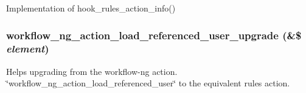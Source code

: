 Implementation of hook\_\-rules\_\-action\_\-info() \hypertarget{userreference_8rules_8inc_83d45657e432a674912574d8efc65684}{
\subsubsection[{workflow\_\-ng\_\-action\_\-load\_\-referenced\_\-user\_\-upgrade}]{\setlength{\rightskip}{0pt plus 5cm}workflow\_\-ng\_\-action\_\-load\_\-referenced\_\-user\_\-upgrade (\&\$ {\em element})}}
\label{userreference_8rules_8inc_83d45657e432a674912574d8efc65684}


Helps upgrading from the workflow-ng action. \char`\"{}workflow\_\-ng\_\-action\_\-load\_\-referenced\_\-user\char`\"{} to the equivalent rules action. 